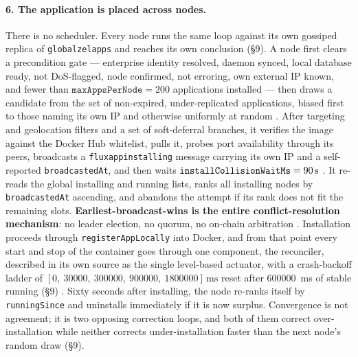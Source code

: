 \paragraph{6. The application is placed across nodes.}
There is no scheduler. Every node runs the same loop against its own gossiped replica of
\texttt{globalzelapps} and reaches its own conclusion (\S9). A node first clears a precondition gate
--- enterprise identity resolved, daemon synced, local database ready, not DoS-flagged, node
confirmed, \fluxbench not erroring, own external IP known, and fewer than
$\texttt{maxAppsPerNode} = 200$ applications installed --- then draws a candidate from the set of
non-expired, under-replicated applications, biased first to those naming its own IP and otherwise
uniformly at random . After
targeting and geolocation filters and a set of soft-deferral branches, it verifies the image against
the Docker Hub whitelist, pulls it, probes port availability through its peers, broadcasts a
\texttt{fluxappinstalling} message carrying its own IP and a self-reported \texttt{broadcastedAt},
and then waits $\texttt{install\allowbreak{}Collision\allowbreak{}Wait\allowbreak{}Ms} = \SI{90}{\second}$
. It re-reads the global installing and running lists,
ranks all installing nodes by \texttt{broadcastedAt} ascending, and abandons the attempt if its rank
does not fit the remaining slots. \textbf{Earliest-broadcast-wins is the entire conflict-resolution
mechanism}: no leader election, no quorum, no on-chain arbitration
. Installation proceeds
through \texttt{register\allowbreak{}App\allowbreak{}Locally} into Docker, and from that point every start and stop of the
container goes through one component, the reconciler, described in its own source as the single
level-based actuator, with a crash-backoff ladder of $[0,\ \num{30000},\ \num{300000},\
\num{900000},\ \num{1800000}]\,\si{\milli\second}$ reset after \SI{600000}{\milli\second} of stable
running (\S9) . Sixty seconds after installing, the
node re-ranks itself by \texttt{runningSince} and uninstalls immediately if it is now surplus.
Convergence is not agreement; it is two opposing correction loops, and both of them correct
over-installation while neither corrects under-installation faster than the next node's random draw
(\S9).

